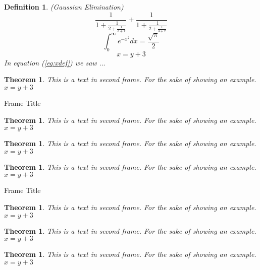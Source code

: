 \documentclass[10pt]{beamer}
\newtheorem{mydef}{Definition}[section]
\newtheorem{mylem}{Theorem}[section]
\newtheorem{mycol}{Theorem}[section]
\newtheorem{myfact}{Theorem}[section]
\newtheorem{mypro}{Theorem}[section]
\newtheorem{mycon}{Theorem}[section]
\newtheorem{myexa}{Theorem}[section]
\newtheorem{myrem}{Theorem}[section]
\begin{document}
\begin{frame}
  \begin{mydef}{(Gaussian Elimination)}
    $$
 \frac{1}{\displaystyle 1+
   \frac{1}{\displaystyle 2+
   \frac{1}{\displaystyle 3+x}}} +
 \frac{1}{1+\frac{1}{2+\frac{1}{3+x}}}
$$
$$\int_0^\infty e^{-x^2} dx=\frac{\sqrt{\pi}}{2}$$
\begin{equation} x=y+3 \label{eq:xdef}
\end{equation}
In equation (\ref{eq:xdef}) we saw $\dots$
  \end{mydef}

  \begin{myrem}{}
        This is a text in second frame.
        For the sake of showing an example.
        $x=y+3$
  \end{myrem}
  
\end{frame}

\begin{frame}{Frame Title}
    \begin{myexa}{}
        This is a text in second frame.
        For the sake of showing an example.
        $x=y+3$
    \end{myexa}

    \begin{mycol}{}
        This is a text in second frame.
        For the sake of showing an example.
        $x=y+3$
    \end{mycol}

    \begin{mylem}{}
        This is a text in second frame.
        For the sake of showing an example.
        $x=y+3$
    \end{mylem}
\end{frame}

\begin{frame}{Frame Title}
    \begin{myfact}{}
        This is a text in second frame.
        For the sake of showing an example.
        $x=y+3$
    \end{myfact}

    \begin{mycon}{}
        This is a text in second frame.
        For the sake of showing an example.
        $x=y+3$
    \end{mycon}

    \begin{mypro}{}
        This is a text in second frame.
        For the sake of showing an example.
        $x=y+3$
    \end{mypro}
\end{frame}
\end{document}
